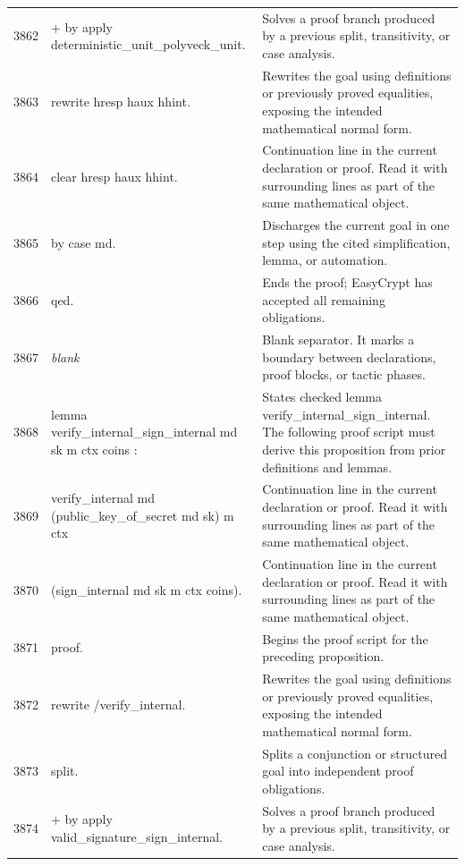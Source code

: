 \documentclass[10pt]{article}
\begin{document}
\begin{longtable}{r L{0.53\textwidth} L{0.37\textwidth}}
3862 & {\ttfamily\scriptsize + by apply deterministic\_unit\_polyveck\_unit.} & Solves a proof branch produced by a previous split, transitivity, or case analysis. \\
3863 & {\ttfamily\scriptsize rewrite hresp haux hhint.} & Rewrites the goal using definitions or previously proved equalities, exposing the intended mathematical normal form. \\
3864 & {\ttfamily\scriptsize clear hresp haux hhint.} & Continuation line in the current declaration or proof.  Read it with surrounding lines as part of the same mathematical object. \\
3865 & {\ttfamily\scriptsize by case md.} & Discharges the current goal in one step using the cited simplification, lemma, or automation. \\
3866 & {\ttfamily\scriptsize qed.} & Ends the proof; EasyCrypt has accepted all remaining obligations. \\
3867 & {\ttfamily\scriptsize \emph{blank}} & Blank separator.  It marks a boundary between declarations, proof blocks, or tactic phases. \\
3868 & {\ttfamily\scriptsize lemma verify\_internal\_sign\_internal md sk m ctx coins :} & States checked lemma verify\_internal\_sign\_internal.  The following proof script must derive this proposition from prior definitions and lemmas. \\
3869 & {\ttfamily\scriptsize   verify\_internal md (public\_key\_of\_secret md sk) m ctx} & Continuation line in the current declaration or proof.  Read it with surrounding lines as part of the same mathematical object. \\
3870 & {\ttfamily\scriptsize     (sign\_internal md sk m ctx coins).} & Continuation line in the current declaration or proof.  Read it with surrounding lines as part of the same mathematical object. \\
3871 & {\ttfamily\scriptsize proof.} & Begins the proof script for the preceding proposition. \\
3872 & {\ttfamily\scriptsize rewrite /verify\_internal.} & Rewrites the goal using definitions or previously proved equalities, exposing the intended mathematical normal form. \\
3873 & {\ttfamily\scriptsize split.} & Splits a conjunction or structured goal into independent proof obligations. \\
3874 & {\ttfamily\scriptsize + by apply valid\_signature\_sign\_internal.} & Solves a proof branch produced by a previous split, transitivity, or case analysis. \\

\end{longtable}
\end{document}
